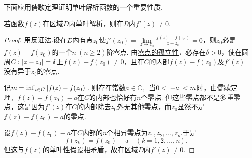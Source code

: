下面应用儒歇定理证明单叶解析函数的一个重要性质.
\begin{theorem}%
若函数\(f(z)\)在区域\(D\)内单叶解析，则在\(D\)内\(f'(z)\neq0\).
\begin{proof}
用反证法.设在\(D\)内有点\(z_0\)使\(f'(z_0)=\lim\limits_{z \to z_0} \frac{f(z)-f(z_0)}{z-z_0}=0\)，则\(z_0\)必是\(f(z)-f(z_0)\)的一个\(n\ (n\geq2)\)阶零点.
由\hyperref[theorem:解析函数的级数表示.解析函数的零点的孤立性]{零点的孤立性}，必存在\(\delta>0\)，使在圆周\(C: \abs{z-z_0}=\delta\)上\(f(z)-f(z_0)\neq0\)，且在\(C\)的内部\(f(z)-f(z_0)\)及\(f'(z)\)没有异于\(z_0\)的零点.

记\(m = \inf_{z \in C} \abs{f(z) - f(z_0)}\).
则存在常数\(a\in\mathbb{C}\)，当\(0<\abs{-a}<m\)时，由儒歇定理，\(f(z)-f(z_0)-a\)在\(C\)的内部也恰好有\(n\)个零点.
但这些零点都不是多重零点，这是因为\(f'(z)\)在\(C\)的内部除去\(z_0\)外无其他零点，而\(z_0\)显然不是\(f(z)-f(z_0)-a\)的零点.

设\(f(z)-f(z_0)-a\)在\(C\)内部的\(n\)个相异零点为\(z_1,z_2,\dotsc,z_n\).于是\[
f(z_k) = f(z_0) + a \quad(k=1,2,\dotsc,n).
\]但这与\(f(z)\)的单叶性假设相矛盾，故在区域\(D\)内\(f'(z)\neq0\).
\end{proof}
\end{theorem}





